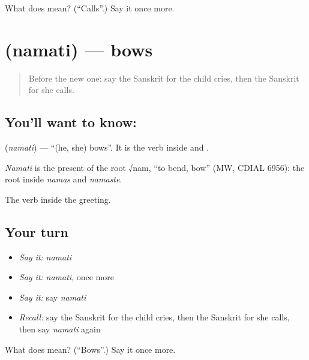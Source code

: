 \begin{tcolorbox}[breakable,colback=teal!4,colframe=teal!35!black,title={Before you move on}]
What does  mean? (\textquotedblleft{}Calls\textquotedblright{}.) Say it once more.
\end{tcolorbox}
\section[\texorpdfstring{\sk{नमति} (namati)}{नमति (namati)}]{ (namati) — bows}

\label{lesson:SA-C73-bows}



\begin{quote}
Before the new one: say the Sanskrit for the child cries, then the Sanskrit for she calls.
\end{quote}

\subsection*{You'll want to know: }
\textbf{} (\emph{namati}) — \textquotedblleft{}(he, she) bows\textquotedblright{}. It is the verb inside \textbf{} and \textbf{}.

\begin{cousinweb}
\emph{Namati} is the present of the root √nam, \textquotedblleft{}to bend, bow\textquotedblright{} (MW, CDIAL 6956): the root inside \emph{namas} and \emph{namaste}.
\end{cousinweb}

\begin{grammarlens}[title={What you've built}]
The verb inside the greeting.
\end{grammarlens}

\subsection*{Your turn}
\begin{itemize}
\raggedright
  \item \emph{Say it:} \emph{namati}
  \item \emph{Say it:} \emph{namati}, once more
  \item \emph{Say it:} say \emph{namati}
  \item \emph{Recall:} say the Sanskrit for the child cries, then the Sanskrit for she calls, then say \emph{namati} again
\end{itemize}

\begin{tcolorbox}[breakable,colback=teal!4,colframe=teal!35!black,title={Before you move on}]
What does  mean? (\textquotedblleft{}Bows\textquotedblright{}.) Say it once more.
\end{tcolorbox}

